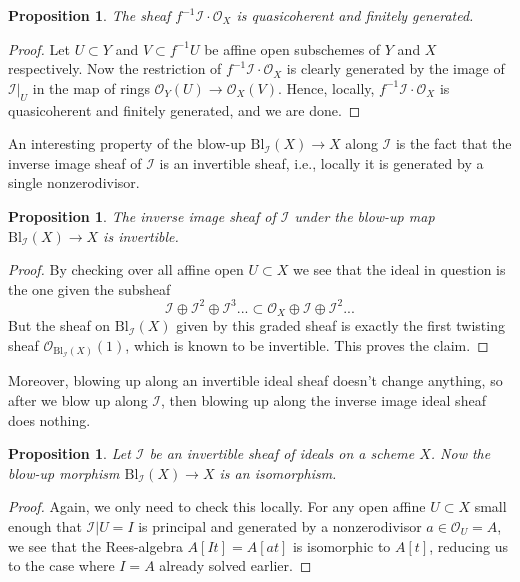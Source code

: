 \documentclass[12pt,a4paper,leqno]{article}
\newcommand{\OO}{\mathcal{O}}
\newcommand{\bl}{\mathrm{Bl}}
\theoremstyle{plain}
\newtheorem{prop}[theo]{Proposition}
\theoremstyle{definition}
\theoremstyle{remark}
\begin{document}
\begin{prop}
The sheaf $f^{-1} \mathscr{I} \cdot \OO_X$ is quasicoherent and finitely generated.
\end{prop}
\begin{proof}
Let $U \subset Y$ and $V \subset f^{-1}U$ be affine open subschemes of $Y$ and $X$ respectively. Now the restriction of $f^{-1} \mathscr{I} \cdot \OO_X$ is clearly generated by the image of $\mathscr{I}|_U$ in the map of rings $\OO_Y (U) \to \OO_X (V)$. Hence, locally, $f^{-1} \mathscr{I} \cdot \OO_X$ is quasicoherent and finitely generated, and we are done.
\end{proof}

An interesting property of the blow-up $\bl_\mathscr{I} (X) \to X$ along $\mathscr{I}$ is the fact that the inverse image sheaf of $\mathscr{I}$ is an invertible sheaf, i.e., locally it is generated by a single nonzerodivisor.

\begin{prop}
The inverse image sheaf of $\mathscr{I}$ under the blow-up map $\bl_\mathscr{I} (X) \to X$ is invertible.
\end{prop}
\begin{proof}
By checking over all affine open $U \subset X$ we see that the ideal in question is the one given the subsheaf 
\begin{equation*}
\mathscr{I} \oplus \mathscr{I}^2 \oplus \mathscr{I}^3 ... \subset \OO_X \oplus \mathscr{I} \oplus \mathscr{I}^2 ... 
\end{equation*}
But the sheaf on $\bl_\mathscr{I} (X)$ given by this graded sheaf is exactly the first twisting sheaf $\OO_{\bl_\mathscr{I} (X)}(1)$, which is known to be invertible. This proves the claim.
\end{proof}

Moreover, blowing up along an invertible ideal sheaf doesn't change anything, so after we blow up along $\mathscr{I}$, then blowing up along the inverse image ideal sheaf does nothing.

\begin{prop}
Let $\mathscr{I}$ be an invertible sheaf of ideals on a scheme $X$. Now the blow-up morphism $\bl_{\mathscr{I}} (X) \to X$ is an isomorphism.
\end{prop}
\begin{proof}
Again, we only need to check this locally. For any open affine $U \subset X$ small enough that $\mathscr{I}|U = I$ is principal and generated by a nonzerodivisor $a \in \OO_U = A$, we see that the Rees-algebra $A[It] = A[at]$ is isomorphic to $A[t]$, reducing us to the case where $I=A$ already solved earlier.   
\end{proof}
\end{document}
